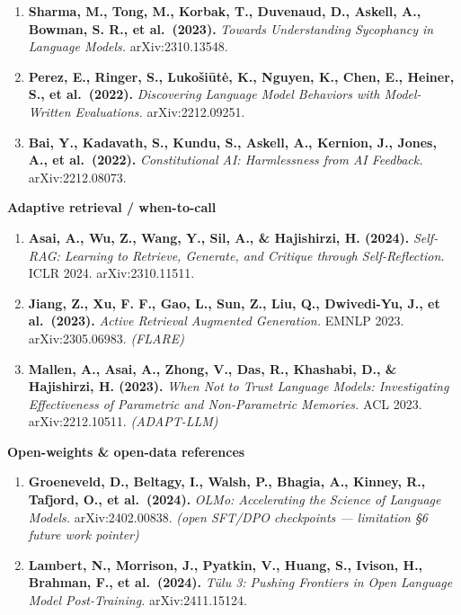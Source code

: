 \documentclass[11pt]{article}
\providecommand{\tightlist}{\setlength{\itemsep}{0pt}\setlength{\parskip}{0pt}}
\begin{document}
\begin{enumerate}
\def\labelenumi{\arabic{enumi}.}
\setcounter{enumi}{8}
\tightlist
\item
  \textbf{Sharma, M., Tong, M., Korbak, T., Duvenaud, D., Askell, A.,
  Bowman, S. R., et al.~(2023).} \emph{Towards Understanding Sycophancy
  in Language Models.} arXiv:2310.13548.
\item
  \textbf{Perez, E., Ringer, S., Lukošiūtė, K., Nguyen, K., Chen, E.,
  Heiner, S., et al.~(2022).} \emph{Discovering Language Model Behaviors
  with Model-Written Evaluations.} arXiv:2212.09251.
\item
  \textbf{Bai, Y., Kadavath, S., Kundu, S., Askell, A., Kernion, J.,
  Jones, A., et al.~(2022).} \emph{Constitutional AI: Harmlessness from
  AI Feedback.} arXiv:2212.08073.
\end{enumerate}

\textbf{Adaptive retrieval / when-to-call}

\begin{enumerate}
\def\labelenumi{\arabic{enumi}.}
\setcounter{enumi}{11}
\tightlist
\item
  \textbf{Asai, A., Wu, Z., Wang, Y., Sil, A., \& Hajishirzi, H.
  (2024).} \emph{Self-RAG: Learning to Retrieve, Generate, and Critique
  through Self-Reflection.} ICLR 2024. arXiv:2310.11511.
\item
  \textbf{Jiang, Z., Xu, F. F., Gao, L., Sun, Z., Liu, Q., Dwivedi-Yu,
  J., et al.~(2023).} \emph{Active Retrieval Augmented Generation.}
  EMNLP 2023. arXiv:2305.06983. \emph{(FLARE)}
\item
  \textbf{Mallen, A., Asai, A., Zhong, V., Das, R., Khashabi, D., \&
  Hajishirzi, H. (2023).} \emph{When Not to Trust Language Models:
  Investigating Effectiveness of Parametric and Non-Parametric
  Memories.} ACL 2023. arXiv:2212.10511. \emph{(ADAPT-LLM)}
\end{enumerate}

\textbf{Open-weights \& open-data references}

\begin{enumerate}
\def\labelenumi{\arabic{enumi}.}
\setcounter{enumi}{14}
\tightlist
\item
  \textbf{Groeneveld, D., Beltagy, I., Walsh, P., Bhagia, A., Kinney,
  R., Tafjord, O., et al.~(2024).} \emph{OLMo: Accelerating the Science
  of Language Models.} arXiv:2402.00838. \emph{(open SFT/DPO checkpoints
  --- limitation §6 future work pointer)}
\item
  \textbf{Lambert, N., Morrison, J., Pyatkin, V., Huang, S., Ivison, H.,
  Brahman, F., et al.~(2024).} \emph{Tülu 3: Pushing Frontiers in Open
  Language Model Post-Training.} arXiv:2411.15124.
\end{enumerate}
\end{document}
